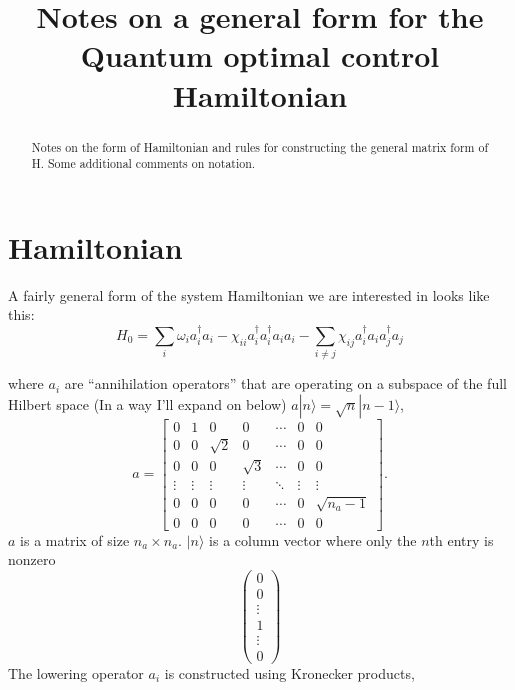 \documentclass{article}
\begin{document}
\title{Notes on a general form for the Quantum optimal control Hamiltonian}

\maketitle

\begin{abstract}
  Notes on the form of Hamiltonian and rules for constructing the general matrix form of H.  Some additional comments on notation.
\end{abstract}

\section{Hamiltonian}

A fairly general form of the system Hamiltonian we are interested in looks like this:
\[
H_0 = \sum_i \omega_i a_i^\dagger a_i -\chi_{ii} a_i^\dagger a_i^\dagger a_i a_i -  \sum_{ i\ne j} \chi_{ij}  a_i^\dagger a_i a_j^\dagger  a_j 
\]

where $a_i$ are ``annihilation operators'' that are operating on a subspace of the full Hilbert space (In a way I'll expand on below)
$a | n \rangle = \sqrt{n} |n-1\rangle$,
\begin{equation}
  a = \begin{bmatrix}
    0 & 1 & 0 & 0 & \dotsm & 0 & 0\\
    0 & 0 & \sqrt{2} & 0 & \dotsm & 0 & 0\\
    0 & 0 & 0 & \sqrt{3} & \dotsm & 0 & 0\\
    \vdots & \vdots & \vdots & \vdots & \ddots & \vdots & \vdots \\
    0 & 0 & 0 & 0 & \dotsm & 0 & \sqrt{n_a-1} \\
    0 & 0 & 0 & 0 & \dotsm & 0 & 0
    \end{bmatrix}.
\end{equation}
$a$ is a matrix of size $n_a \times n_a$. $|n\rangle$ is a column vector where only the $n$th entry is nonzero
\[
\begin{pmatrix}
  0 \\  0 \\ \vdots  \\ 1  \\ \vdots  \\ 0
\end{pmatrix}
\]
The lowering operator $a_i$ is constructed using Kronecker products,
  
\end{document}
